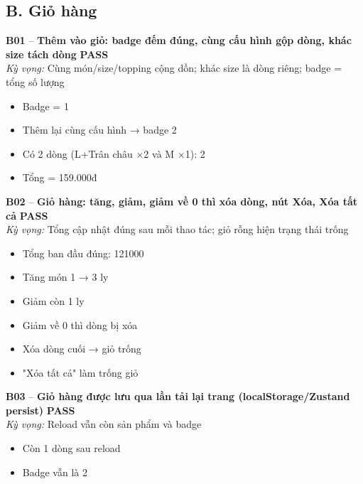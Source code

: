 \documentclass[a4paper,11pt]{article}
\newcommand{\ok}{\textcolor{okgreen}{\textbf{PASS}}}
\begin{document}
\subsection{B. Giỏ hàng}
\begin{minipage}{\textwidth}\vspace{4pt}\textbf{\textcolor{brew}{B01}} -- \textbf{Thêm vào giỏ: badge đếm đúng, cùng cấu hình gộp dòng, khác size tách dòng} \hfill \ok\\
{\small\emph{Kỳ vọng:} Cùng món/size/topping cộng dồn; khác size là dòng riêng; badge = tổng số lượng}
\end{minipage}
\begin{itemize}\footnotesize
\item \tick Badge = 1
\item \tick Thêm lại cùng cấu hình → badge 2
\item \tick Có 2 dòng (L+Trân châu ×2 và M ×1): 2
\item \tick Tổng = 159.000đ
\end{itemize}
\begin{minipage}{\textwidth}\vspace{4pt}\textbf{\textcolor{brew}{B02}} -- \textbf{Giỏ hàng: tăng, giảm, giảm về 0 thì xóa dòng, nút Xóa, Xóa tất cả} \hfill \ok\\
{\small\emph{Kỳ vọng:} Tổng cập nhật đúng sau mỗi thao tác; giỏ rỗng hiện trạng thái trống}
\end{minipage}
\begin{itemize}\footnotesize
\item \tick Tổng ban đầu đúng: 121000
\item \tick Tăng món 1 → 3 ly
\item \tick Giảm còn 1 ly
\item \tick Giảm về 0 thì dòng bị xóa
\item \tick Xóa dòng cuối → giỏ trống
\item \tick "Xóa tất cả" làm trống giỏ
\end{itemize}
\begin{minipage}{\textwidth}\vspace{4pt}\textbf{\textcolor{brew}{B03}} -- \textbf{Giỏ hàng được lưu qua lần tải lại trang (localStorage/Zustand persist)} \hfill \ok\\
{\small\emph{Kỳ vọng:} Reload vẫn còn sản phẩm và badge}
\end{minipage}
\begin{itemize}\footnotesize
\item \tick Còn 1 dòng sau reload
\item \tick Badge vẫn là 2
\end{itemize}
\end{document}
